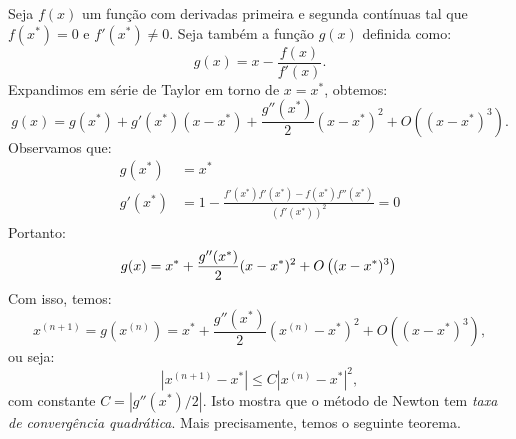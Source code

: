 Seja $f(x)$ um função com derivadas primeira e segunda contínuas tal que $f(x^*)=0$ e $f'(x^*)\neq 0$. Seja também a função $g(x)$ definida como:
\begin{equation*}
  g(x)=x-\frac{f(x)}{f'(x)}.
\end{equation*}
Expandimos em série de Taylor em torno de $x = x^*$, obtemos:
\begin{equation*}
  g(x)=g(x^*)+g'(x^*)(x-x^*) + \frac{g''(x^*)}{2}(x-x^*)^2 + O\left((x-x^*)^3\right).
\end{equation*}
Observamos que:
\begin{align*}
g(x^*) &= x^*\\
g'(x^*) &= 1 - \frac{f'(x^*)f'(x^*)-f(x^*)f''(x^*)}{\left(f'(x^*)\right)^2} = 0
\end{align*}
Portanto:
\begin{equation*}
g(x) = x^* + \frac{g''(x^*)}{2}(x-x^*)^2 + O\left((x-x^*)^3\right)\\
\end{equation*}
Com isso, temos:
\begin{equation*}
x^{(n+1)} = g(x^{(n)}) =  x^*+ \frac{g''(x^*)}{2}(x^{(n)}-x^*)^2 + O\left((x-x^*)^3\right),
\end{equation*}
ou seja:
\begin{equation*}
\left|x^{(n+1)}-x^*\right| \leq C\left|x^{(n)}-x^*\right|^2,
\end{equation*}
com constante $C = \left|g''(x^*)/2\right|$. Isto mostra que o método de Newton tem \emph{taxa de convergência quadrática}. Mais precisamente, temos o seguinte teorema.

